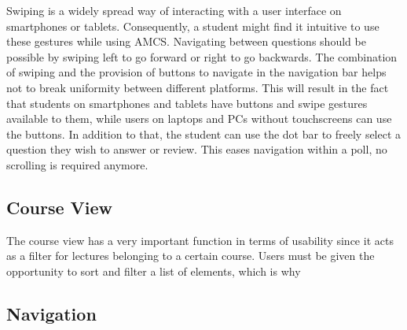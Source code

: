 Swiping is a widely spread way of interacting with a user interface on smartphones or tablets. Consequently, a student might find it intuitive to use these gestures while using AMCS. Navigating between questions should be possible by swiping left to go forward or right to go backwards. The combination of swiping and the provision of buttons to navigate in the navigation bar helps not to break uniformity between different platforms. This will result in the fact that students on smartphones and tablets have buttons and swipe gestures available to them, while users on laptops and PCs without touchscreens can use the buttons.
In addition to that, the student can use the dot bar to freely select a question they wish to answer or review. This eases navigation within a poll, no scrolling is required anymore.


\subsection{Course View}
The course view has a very important function in terms of usability since it acts as a filter for lectures belonging to a certain course. Users must be given the opportunity to sort and filter a list of elements, which is why
\subsection{Navigation}

